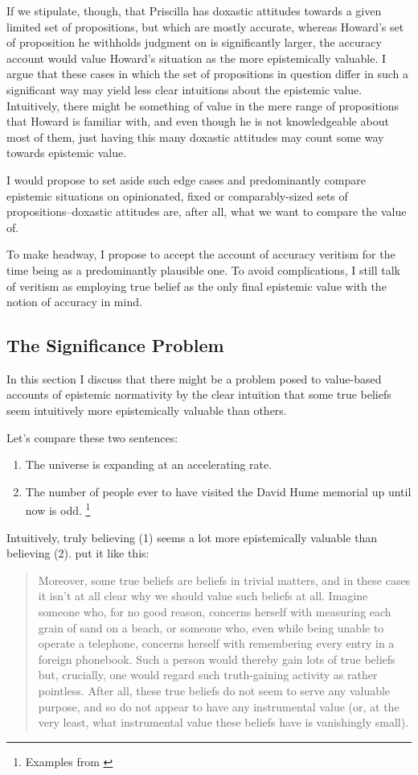 \documentclass[12pt,numbers=noenddot]{scrartcl}
\begin{document}
If we stipulate, though, that Priscilla has doxastic attitudes towards a given limited set of propositions, but which are mostly accurate, whereas Howard's set of proposition he withholds judgment on is significantly larger, the accuracy account would value Howard's situation as the more epistemically valuable. I argue that these cases in which the set of propositions in question differ in such a significant way may yield less clear intuitions about the epistemic value. Intuitively, there might be something of value in the mere range of propositions that Howard is familiar with, and even though he is not knowledgeable about most of them, just having this many doxastic attitudes may count some way towards epistemic value.

I would propose to set aside such edge cases and predominantly compare epistemic situations on opinionated, fixed or comparably-sized sets of propositions–doxastic attitudes are, after all, what we want to compare the value of.

To make headway, I propose to accept the account of accuracy veritism for the time being as a predominantly plausible one. To avoid complications, I still talk of veritism as employing true belief as the only final epistemic value with the notion of accuracy in mind.

\subsection{The Significance Problem}


In this section I discuss that there might be a problem posed to value-based accounts of epistemic normativity by the clear intuition that some true beliefs seem intuitively more epistemically valuable than others.

Let's compare these two sentences:
\begin{enumerate}
    \item The universe is expanding at an accelerating rate.
    \item The number of people ever to have visited the David Hume memorial up until now is odd. \footnote{Examples from \textcite{Ahlstrom-Vij2013}}
\end{enumerate}

Intuitively, truly believing (1) seems a lot more epistemically valuable than believing (2). \textcite{sep-knowledge-value} put it like this:

\begin{quote}
    Moreover, some true beliefs are beliefs in trivial matters, and in these cases it isn't at all clear why we should value such beliefs at all. Imagine someone who, for no good reason, concerns herself with measuring each grain of sand on a beach, or someone who, even while being unable to operate a telephone, concerns herself with remembering every entry in a foreign phonebook. Such a person would thereby gain lots of true beliefs but, crucially, one would regard such truth-gaining activity as rather pointless. After all, these true beliefs do not seem to serve any valuable purpose, and so do not appear to have any instrumental value (or, at the very least, what instrumental value these beliefs have is vanishingly small).
\end{quote}
\end{document}
